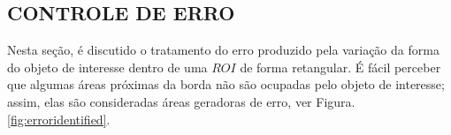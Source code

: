 \subsection{CONTROLE DE ERRO}

Nesta seção, é discutido o tratamento do erro produzido pela variação da forma do objeto de interesse dentro de uma
$ROI$ de forma retangular. É fácil perceber que algumas áreas próximas da borda não são ocupadas pelo objeto de interesse;
assim, elas são consideradas áreas geradoras de erro, ver Figura. \ref{fig:erroridentified}.

